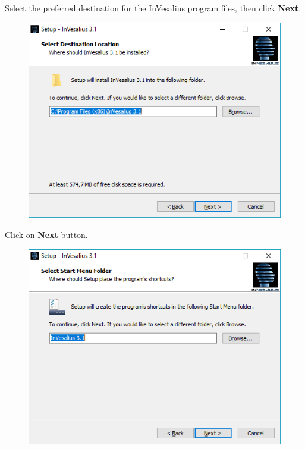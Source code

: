 \hspace{.2cm}

Select the preferred destination for the InVesalius program files, then click \textbf{Next}.

\begin{figure}[!htb]  
\centering
\includegraphics[scale=0.7]{../user_guide_figures/invesalius_screen/installation_folder_en.png}
\end{figure}

\newpage

Click on \textbf{Next}  button.
\begin{figure}[!htb]
\centering
\includegraphics[scale=0.7]{../user_guide_figures/invesalius_screen/installation_program_name_en.png}
\end{figure}

